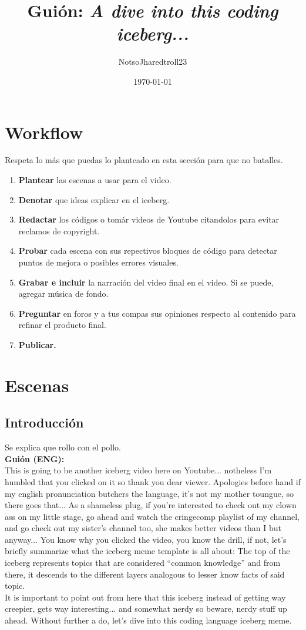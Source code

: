 \documentclass[letterpaper, 12pt]{article}
\title{\textbf{Guión:} 
    {\fontfamily{qag}\selectfont
        \emph{A dive into this coding iceberg... }
    }
}
\author{NotsoJharedtroll23}
\date{\today}
\begin{document}
\maketitle
\thispagestyle{empty}
\section*{Workflow}
\justify
Respeta lo más que puedas lo planteado en esta sección para que no batalles.
    \begin{enumerate}
        \item \textbf{Plantear} las escenas a usar para el video.
        \item \textbf{Denotar} que ideas explicar en el iceberg.
        \item \textbf{Redactar} los códigos o tomár videos de Youtube citandolos para evitar reclamos de copyright.
        \item \textbf{Probar} cada escena con sus repectivos bloques de código para detectar puntos de mejora o posibles errores visuales.
        \item \textbf{Grabar e incluir} la narración del video final en el video. Si se puede, agregar música de fondo.
        \item \textbf{Preguntar} en foros y a tus compas sus opiniones respecto al contenido para refinar el producto final.
        \item \textbf{Publicar.}
    \end{enumerate}

\section*{Escenas}
\subsection*{{\selectfont Introducción}} \justify
Se explica que rollo con el pollo.\\\textbf{Guión (ENG):}\\\newline
This is going to be another iceberg video here on Youtube... notheless I'm humbled that you clicked on it so thank you dear viewer. Apologies before hand if my english pronunciation butchers the language, it's not my mother toungue, so there goes that... 
As a shameless plug, if you're interested to check out my clown ass on my little stage, go ahead and watch 
the cringecomp playlist of my channel, and go check out my sister's channel too, she makes better videos than I but anyway... You know why you clicked the video, you know the drill, if not, let's briefly summarize what the iceberg meme template is all about:
The top of the iceberg represents topics that are considered ``common knowledge'' and from there, it descends to the different layers analogous to lesser know facts of said topic.\\
It is important to point out from here that this iceberg instead of getting way creepier, gets way interesting... and somewhat nerdy so beware, nerdy stuff up ahead. Without further a do, let's dive into this coding language iceberg meme.
\end{document}
